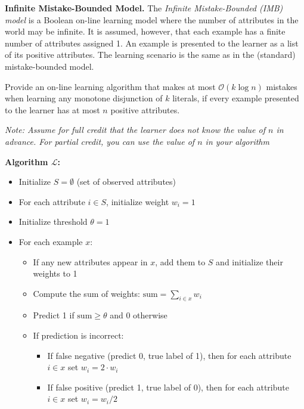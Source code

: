 \documentclass[11pt]{article}
\DeclareMathOperator{\1}{\mathbbm{1}}
\begin{document}
\begin{problem} [15pts] \textbf{Infinite Mistake-Bounded Model.}
	The \textit{Infinite Mistake-Bounded (IMB) model} is a Boolean on-line learning model where the number
of attributes in the world may be infinite. It is assumed, however, that each example has a finite
number of attributes assigned 1. An example is presented to the learner as a list of its positive
attributes. The learning scenario is the same as in the (standard) mistake-bounded model.

Provide an on-line learning algorithm that makes at most $\mathcal O(k \log n)$ mistakes when learning any
monotone disjunction of $k$ literals, if every example presented to the learner has at most $n$ positive
attributes.

\textit{Note: Assume for full credit that the learner does \textit{not} know the value of $n$ in advance. For partial credit, you can use the value of $n$ in your algorithm}

\textbf{Algorithm $\mathcal{L}$:}
\begin{itemize}
	\item Initialize $S = \emptyset$ (set of observed attributes)
	\item For each attribute $i \in S$, initialize weight $w_i = 1$
	\item Initialize threshold $\theta = 1$
	\item For each example $x$: \begin{itemize}
		\item If any new attributes appear in $x$, add them to $S$ and initialize their weights to 1
		\item Compute the sum of weights: $\text{sum} = \sum_{i \in x} w_i$
		\item Predict 1 if $\text{sum} \geq \theta$ and 0 otherwise
		\item If prediction is incorrect: \begin{itemize}
			\item If false negative (predict 0, true label of 1), then for each attribute $i \in x$ set $w_i = 2 \cdot w_i$
			\item If false positive (predict 1, true label of 0), then for each attribute $i \in x$ set $w_i = w_i/2$
		\end{itemize}
	\end{itemize}
\end{itemize}


\end{problem}
\end{document}

